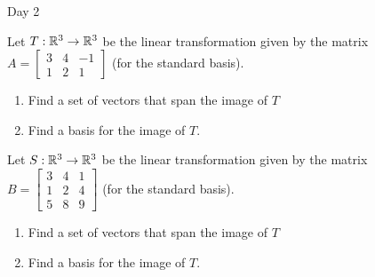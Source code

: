 \documentclass{article}[12pt]
\begin{document}
\begin{applicationActivities}{Day 2}
\begin{activity}
Let $T: \mathbb{R}^3 \rightarrow \mathbb{R}^3$ be the linear transformation given by the matrix $A=\begin{bmatrix} 3 & 4 & -1 \\ 1 & 2 & 1 \end{bmatrix}$ (for the standard basis).
\begin{enumerate}[1)]
\item Find a set of vectors that span the image of $T$
\item Find a basis for the image of $T$.
\end{enumerate}
\end{activity}

\begin{activity}
Let $S: \mathbb{R}^3 \rightarrow \mathbb{R}^3$ be the linear transformation given by the matrix $B=\begin{bmatrix} 3 & 4 & 1 \\ 1 & 2 & 4 \\ 5 & 8 & 9  \end{bmatrix}$ (for the standard basis).
\begin{enumerate}[1)]
\item Find a set of vectors that span the image of $T$
\item Find a basis for the image of $T$.
\end{enumerate}
\end{activity}

\end{applicationActivities}
\end{document}
